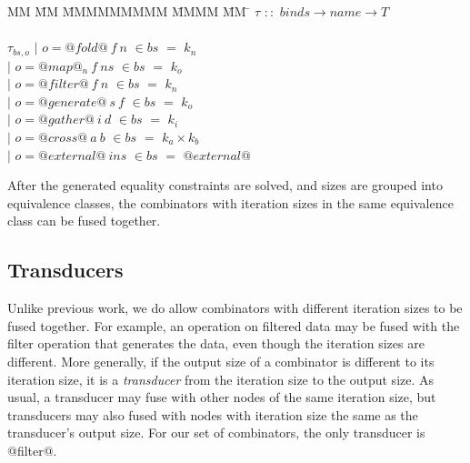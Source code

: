 \begin{tabbing}
MM \= MM \= MMMMMMMMM \= MMMM \= MM \= \kill
$\tau$  \>$::$\> $binds \rightarrow name \rightarrow T$ \\
\\
$\tau_{bs,o}$    
            \> $|$ \> $o = @fold@~f~n$      \> $\in bs$ \> $=$ \> $k_n$ \\
            \> $|$ \> $o = @map@_n~f~ns$    \> $\in bs$ \> $=$ \> $k_o$ \\
            \> $|$ \> $o = @filter@~f~n$    \> $\in bs$ \> $=$ \> $k_n$ \\
            \> $|$ \> $o = @generate@~s~f$  \> $\in bs$ \> $=$ \> $k_o$ \\
            \> $|$ \> $o = @gather@~i~d$    \> $\in bs$ \> $=$ \> $k_i$ \\
            \> $|$ \> $o = @cross@~a~b$     \> $\in bs$ \> $=$ \> $k_a \times k_b$ \\
            \> $|$ \> $o = @external@~ins$  \> $\in bs$ \> $=$ \> $@external@$ \\
\end{tabbing}

After the generated equality constraints are solved, and sizes are grouped into equivalence classes, the combinators with iteration sizes in the same equivalence class can be fused together.

\subsection{Transducers}
Unlike previous work, we do allow combinators with different iteration sizes to be fused together.
For example, an operation on filtered data may be fused with the filter operation that generates the data, even though the iteration sizes are different.
More generally, if the output size of a combinator is different to its iteration size, it is a \emph{transducer} from the iteration size to the output size.
As usual, a transducer may fuse with other nodes of the same iteration size,
but transducers may also fused with nodes with iteration size the same as the transducer's output size.
For our set of combinators, the only transducer is @filter@.


